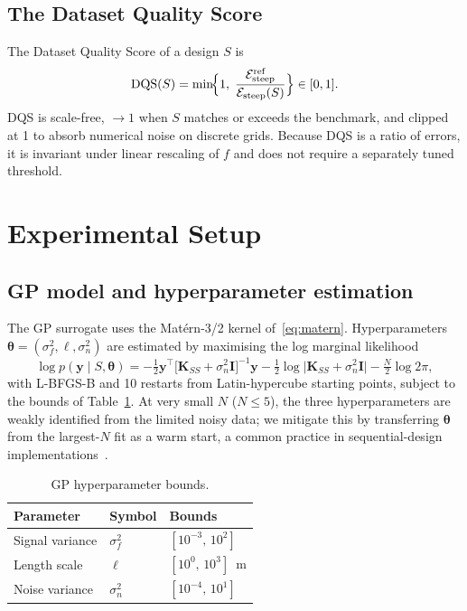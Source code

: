 \documentclass[11pt,letterpaper]{article}
\begin{document}
\subsection{The Dataset Quality Score}
\label{sec:dqs}
The Dataset Quality Score of a design $S$ is
\begin{equation}
\label{eq:dqs}
\mathrm{DQS}(S)=\min\!\Bigl\{1,\;
\frac{\mathcal{E}_{\text{steep}}^{\text{ref}}}
     {\mathcal{E}_{\text{steep}}(S)}\Bigr\}\in[0,1].
\end{equation}
DQS is scale-free, $\to 1$ when $S$ matches or exceeds the benchmark,
and clipped at 1 to absorb numerical noise on discrete grids. Because
DQS is a ratio of errors, it is invariant under linear rescaling of $f$
and does not require a separately tuned threshold.

\section{Experimental Setup}
\label{sec:setup}

\subsection{GP model and hyperparameter estimation}
\label{sec:gp-config}
The GP surrogate uses the Mat\'ern-3/2 kernel of~\eqref{eq:matern}.
Hyperparameters
$\boldsymbol{\theta}=(\sigma_{f}^{2},\ell,\sigma_{n}^{2})$ are
estimated by maximising the log marginal likelihood
\begin{equation}
\label{eq:loglik}
\log p(\mathbf{y}\mid S,\boldsymbol{\theta})=
-\tfrac{1}{2}\mathbf{y}^{\!\top}
\bigl[\mathbf{K}_{SS}+\sigma_{n}^{2}\mathbf{I}\bigr]^{-1}\mathbf{y}
-\tfrac{1}{2}\log\bigl|\mathbf{K}_{SS}+\sigma_{n}^{2}\mathbf{I}\bigr|
-\tfrac{N}{2}\log 2\pi,
\end{equation}
with L-BFGS-B and 10 restarts from Latin-hypercube starting points,
subject to the bounds of Table~\ref{tab:hyperbounds}. At very small
$N$ ($N\le 5$), the three hyperparameters are weakly identified from
the limited noisy data; we mitigate this by transferring
$\boldsymbol{\theta}$ from the largest-$N$ fit as a warm start, a
common practice in sequential-design implementations~\citep{binois2019replication}.

\begin{table}[H]
\centering
\caption{GP hyperparameter bounds.}
\label{tab:hyperbounds}
\begin{tabular}{@{}lll@{}}
\toprule
Parameter        & Symbol           & Bounds \\
\midrule
Signal variance  & $\sigma_{f}^{2}$ & $[10^{-3},\,10^{2}]$ \\
Length scale     & $\ell$           & $[10^{0},\,10^{3}]$~m \\
Noise variance   & $\sigma_{n}^{2}$ & $[10^{-4},\,10^{1}]$ \\
\bottomrule
\end{tabular}
\end{table}
\end{document}
